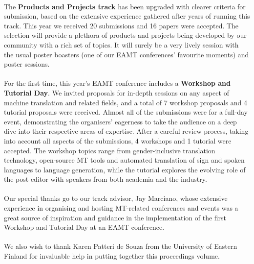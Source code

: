 \documentclass[a4paper,11pt,twoside]{book}
\begin{document}
\begin{onehalfspacing}
\\
\noindent
The \textbf{Products and Projects track} has been upgraded with clearer criteria for submission, based on the extensive experience gathered after years of running this track. This year we received 20 submissions and 16 papers were accepted. The selection will provide a plethora of products and projects being developed by our community with a rich set of topics. It will surely be a very lively session with the usual poster boasters (one of our EAMT conferences’ favourite moments) and poster sessions.\\  
\\
\noindent
For the first time, this year's EAMT conference includes a \textbf{Workshop and Tutorial Day}. We invited proposals for in-depth sessions on any aspect of machine translation and related fields, and a total of 7 workshop proposals and 4 tutorial proposals were received. Almost all of the submissions were for a full-day event, demonstrating the organisers' eagerness to take the audience on a deep dive into their respective areas of expertise. After a careful review process, taking into account all aspects of the submissions, 4 workshops and 1 tutorial were accepted. The workshop topics range from gender-inclusive translation technology, open-source MT tools and automated translation of sign and spoken languages to language generation, while the tutorial explores the evolving role of the post-editor with speakers from both academia and the industry.\\
\\
\noindent
Our special thanks go to our track advisor, Jay Marciano, whose extensive experience in organising and hosting MT-related conferences and events was a great source of inspiration and guidance in the implementation of the first Workshop and Tutorial Day at an EAMT conference.\\
\\
\noindent
We also wish to thank Karen Patteri de Souza from the University of Eastern Finland for invaluable help in putting together this proceedings volume.\\


\end{onehalfspacing}
\end{document}
